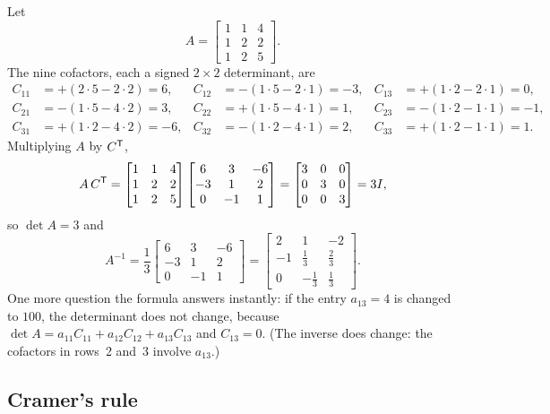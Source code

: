 \begin{example}\label{ex:u22-cofactors}
Let
\[
  A=\begin{bmatrix} 1&1&4\\ 1&2&2\\ 1&2&5\end{bmatrix}.
\]
The nine cofactors, each a signed $2\times 2$ determinant, are
\begin{align*}
C_{11}&=+(2\cdot5-2\cdot2)=6, & C_{12}&=-(1\cdot5-2\cdot1)=-3, & C_{13}&=+(1\cdot2-2\cdot1)=0,\\
C_{21}&=-(1\cdot5-4\cdot2)=3, & C_{22}&=+(1\cdot5-4\cdot1)=1, & C_{23}&=-(1\cdot2-1\cdot1)=-1,\\
C_{31}&=+(1\cdot2-4\cdot2)=-6, & C_{32}&=-(1\cdot2-4\cdot1)=2, & C_{33}&=+(1\cdot2-1\cdot1)=1.
\end{align*}
Multiplying $A$ by $C^{\mathsf{T}}$,
\[
  A\,C^{\mathsf{T}}=\begin{bmatrix} 1&1&4\\ 1&2&2\\ 1&2&5\end{bmatrix}
  \begin{bmatrix} 6&3&-6\\ -3&1&2\\ 0&-1&1\end{bmatrix}
  =\begin{bmatrix} 3&0&0\\ 0&3&0\\ 0&0&3\end{bmatrix}=3I,
\]
so $\det A=3$ and
\[
  A^{-1}=\frac13\begin{bmatrix} 6&3&-6\\ -3&1&2\\ 0&-1&1\end{bmatrix}
  =\begin{bmatrix} 2&1&-2\\ -1&\tfrac13&\tfrac23\\ 0&-\tfrac13&\tfrac13\end{bmatrix}.
\]
One more question the formula answers instantly: if the entry $a_{13}=4$ is changed to
$100$, the determinant does not change, because $\det A=a_{11}C_{11}+a_{12}C_{12}+a_{13}C_{13}$
and $C_{13}=0$. (The inverse does change: the cofactors in rows~2 and~3 involve $a_{13}$.)
\end{example}

\subsection{Cramer's rule}

